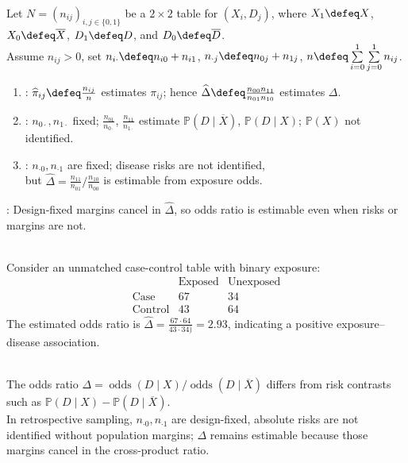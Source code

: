 \begin{method} \label{meth:odds-ratio-by-sampling-design} \\
Let $N=(n_{ij})_{i,j\in\{0,1\}}$ be a $2\times2$ table for $(X_i,D_j)$, where $X_1\defeq X$, $X_0\defeq\overline{X}$, $D_1\defeq D$, and $D_0\defeq\overline{D}$.\\
Assume $n_{ij}>0$, set $n_{i\cdot}\defeq n_{i0}+n_{i1}$, $n_{\cdot j}\defeq n_{0j}+n_{1j}$, $n\defeq\sum\limits_{i=0}^{1}\sum\limits_{j=0}^{1}n_{ij}$.
\begin{enumerate}[label=(\roman*)]
\setlength{\itemsep}{0pt}
\item {}: $\widehat{\pi}_{ij}\defeq\frac{n_{ij}}{n}$ estimates $\pi_{ij}$; hence $\widehat{\Delta}\defeq\frac{n_{00}n_{11}}{n_{01}n_{10}}$ estimates $\Delta$.
\item {}: $n_{0\cdot},n_{1\cdot}$ fixed; $\frac{n_{01}}{n_{0\cdot}}$, $\frac{n_{11}}{n_{1\cdot}}$ estimate $\mathbb{P}(D\mid\overline{X})$, $\mathbb{P}(D\mid X)$; $\mathbb{P}(X)$ not identified.
\item {}: $n_{\cdot0},n_{\cdot1}$ are fixed; disease risks are not identified,\\
but $\widehat{\Delta}=\frac{n_{11}}{n_{01}}/\frac{n_{10}}{n_{00}}$ is estimable from exposure odds.
\end{enumerate}
: Design-fixed margins cancel in $\widehat{\Delta}$, so odds ratio is estimable even when risks or margins are not.
\end{method}

\begin{example} \label{ex:unmatched-case-control-odds-ratio} \\
Consider an unmatched case-control table with binary exposure:
\[
\begin{array}{c|cc}
&\text{Exposed}&\text{Unexposed}\\ \hline
\text{Case}&67&34\\
\text{Control}&43&64
\end{array}
\]
The estimated odds ratio is $\widehat{\Delta}=\frac{67\cdot64}{43\cdot34)}=2.93$, indicating a positive exposure--disease association.
\end{example}

\begin{remark} \label{rem:odds-ratio-risk-and-retrospective-caution} \\
The odds ratio $\Delta=\operatorname{odds}(D\mid X)/\operatorname{odds}(D\mid\overline{X})$ differs from risk contrasts such as $\mathbb{P}(D\mid X)-\mathbb{P}(D\mid\overline{X})$.\\
In retrospective sampling, $n_{\cdot0},n_{\cdot1}$ are design-fixed, absolute risks are not identified without population margins; $\Delta$ remains estimable because those margins cancel in the cross-product ratio.
\end{remark}
